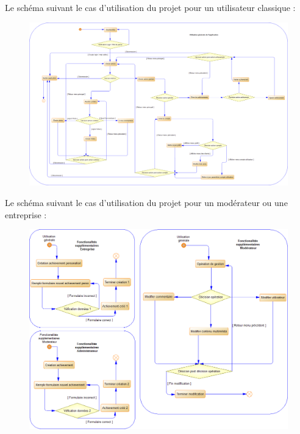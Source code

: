 \documentclass{life-fr}
\begin{document}
\newpage

Le schéma suivant le cas d'utilisation du projet pour un utilisateur classique :
\begin{figure}[H]
  \begin{center}
    \includegraphics[width=17cm]{img/processus_principaux_2.png}
  \end{center}
\end{figure}

\newpage

Le schéma suivant le cas d'utilisation du projet pour un modérateur ou une entreprise :
\begin{figure}[H]
  \begin{center}
    \includegraphics[width=17cm]{img/processus_principaux_1.png}
  \end{center}
\end{figure}
\end{document}

